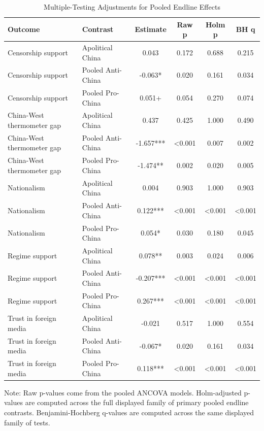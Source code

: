 \begin{table}[H]
\centering
\caption{Multiple-Testing Adjustments for Pooled Endline Effects}
\label{tab:multiple_testing_t1}
\footnotesize
\begin{threeparttable}
\begin{tabular}{llcccc}
\toprule
Outcome & Contrast & Estimate & Raw p & Holm p & BH q \\
\midrule
Censorship support & Apolitical China & 0.043 & 0.172 & 0.688 & 0.215 \\
Censorship support & Pooled Anti-China & -0.063* & 0.020 & 0.161 & 0.034 \\
Censorship support & Pooled Pro-China & 0.051+ & 0.054 & 0.270 & 0.074 \\
China-West thermometer gap & Apolitical China & 0.437 & 0.425 & 1.000 & 0.490 \\
China-West thermometer gap & Pooled Anti-China & -1.657*** & <0.001 & 0.007 & 0.002 \\
China-West thermometer gap & Pooled Pro-China & -1.474** & 0.002 & 0.020 & 0.005 \\
Nationalism & Apolitical China & 0.004 & 0.903 & 1.000 & 0.903 \\
Nationalism & Pooled Anti-China & 0.122*** & <0.001 & <0.001 & <0.001 \\
Nationalism & Pooled Pro-China & 0.054* & 0.030 & 0.180 & 0.045 \\
Regime support & Apolitical China & 0.078** & 0.003 & 0.024 & 0.006 \\
Regime support & Pooled Anti-China & -0.207*** & <0.001 & <0.001 & <0.001 \\
Regime support & Pooled Pro-China & 0.267*** & <0.001 & <0.001 & <0.001 \\
Trust in foreign media & Apolitical China & -0.021 & 0.517 & 1.000 & 0.554 \\
Trust in foreign media & Pooled Anti-China & -0.067* & 0.020 & 0.161 & 0.034 \\
Trust in foreign media & Pooled Pro-China & 0.118*** & <0.001 & <0.001 & <0.001 \\
\bottomrule
\end{tabular}
\begin{tablenotes}[flushleft]
\footnotesize
\item Note: Raw p-values come from the pooled ANCOVA models. Holm-adjusted p-values are computed across the full displayed family of primary pooled endline contrasts. Benjamini-Hochberg q-values are computed across the same displayed family of tests.
\end{tablenotes}
\end{threeparttable}
\end{table}
